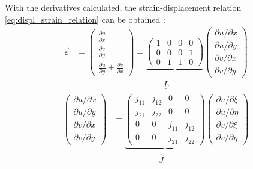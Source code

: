   With the derivatives calculated, the strain-displacement relation \eqref{eq:displ_strain_relation} can be obtained \cite{cook2002concepts}:
  \begin{align}
  \vec{\varepsilon} &= \begin{pmatrix}
  \frac{\partial u}{\partial x} \\
  \frac{\partial v}{\partial y} \\
  \frac{\partial u}{\partial y} + \frac{\partial v}{\partial x}
  \end{pmatrix} = \underbrace{\begin{pmatrix}
  1&0&0&0\\
  0&0&0&1\\
  0&1&1&0
  \end{pmatrix}} \begin{pmatrix}
  {\partial u}/{\partial x} \\ {\partial u}/{\partial y} \\ {\partial v}/{\partial x} \\ {\partial v}/{\partial y}
  \end{pmatrix} \\
  &\qquad\qquad\qquad\qquad\qquad\,\: \underline{L} \nonumber
  \end{align}
  \begin{align}
  \begin{pmatrix}
  {\partial u}/{\partial x} \\ {\partial u}/{\partial y} \\ {\partial v}/{\partial x} \\ {\partial v}/{\partial y}
  \end{pmatrix} &= \underbrace{\begin{pmatrix}
  j_{11} & j_{12} & 0 & 0\\
  j_{21} & j_{22} & 0 & 0\\
  0 & 0 & j_{11} & j_{12}\\
  0 & 0 & j_{21} & j_{22}
  \end{pmatrix}} \begin{pmatrix}
  {\partial u}/{\partial \xi} \\ {\partial u}/{\partial \eta} \\ {\partial v}/{\partial \xi} \\ {\partial v}/{\partial \eta}
  \end{pmatrix}\\
  &\qquad\qquad\quad\,\: \underline{\hat{J}} \nonumber
  \end{align}

